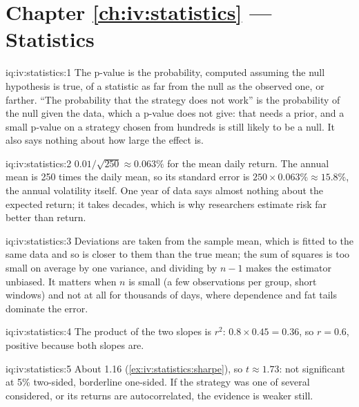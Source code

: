 \section*{Chapter \ref{ch:iv:statistics} --- Statistics}

\begin{solution}{iq:iv:statistics:1}
The p-value is the probability, computed assuming the null hypothesis is true, of a statistic as far from the null as the observed
one, or farther. ``The probability that the strategy does not work'' is the probability of the null given the data, which a
p-value does not give: that needs a prior, and a small p-value on a strategy chosen from hundreds is still likely to be
a null. It also says nothing about how large the effect is.
\end{solution}

\begin{solution}{iq:iv:statistics:2}
$0.01/\sqrt{250} \approx 0.063\%$ for the mean daily return. The annual mean is 250 times the daily mean, so its
standard error is $250 \times 0.063\% \approx 15.8\%$, the annual volatility itself. One year of data says almost nothing
about the expected return; it takes decades, which is why researchers estimate risk far better than return.
\end{solution}

\begin{solution}{iq:iv:statistics:3}
Deviations are taken from the sample mean, which is fitted to the same data and so is closer to them than the true mean;
the sum of squares is too small on average by one variance, and dividing by $n - 1$ makes the estimator unbiased. It
matters when $n$ is small (a few observations per group, short windows) and not at all for thousands of days, where
dependence and fat tails dominate the error.
\end{solution}

\begin{solution}{iq:iv:statistics:4}
The product of the two slopes is $r^2$: $0.8 \times 0.45 = 0.36$, so $r = 0.6$, positive because both slopes are.
\end{solution}

\begin{solution}{iq:iv:statistics:5}
About 1.16 (\cref{ex:iv:statistics:sharpe}), so $t \approx 1.73$: not significant at 5\% two-sided, borderline one-sided.
If the strategy was one of several considered, or its returns are autocorrelated, the evidence is weaker still.
\end{solution}

